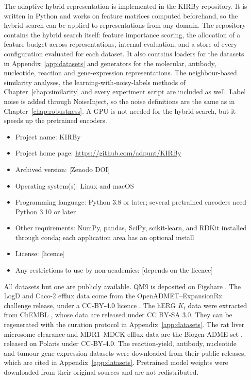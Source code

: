 The adaptive hybrid representation is implemented in the KIRBy repository. It is written in Python and works on feature matrices computed beforehand, so the hybrid search can be applied to representations from any domain. The repository contains the hybrid search itself: feature importance scoring, the allocation of a feature budget across representations, internal evaluation, and a store of every configuration evaluated for each dataset. It also contains loaders for the datasets in Appendix~\ref{app:datasets} and generators for the molecular, antibody, nucleotide, reaction and gene-expression representations. The neighbour-based similarity analyses, the learning-with-noisy-labels methods of Chapter~\ref{chap:similarity} and every experiment script are included as well. Label noise is added through NoiseInject, so the noise definitions are the same as in Chapter~\ref{chap:robustness}. A GPU is not needed for the hybrid search, but it speeds up the pretrained encoders.

\begin{itemize}
    \item Project name: KIRBy
    \item Project home page: \url{https://github.com/adpunt/KIRBy}
    \item Archived version: [Zenodo DOI]
    \item Operating system(s): Linux and macOS
    \item Programming language: Python 3.8 or later; several pretrained encoders need Python 3.10 or later
    \item Other requirements: NumPy, pandas, SciPy, scikit-learn, and RDKit installed through conda; each application area has an optional install
    \item License: [licence]
    \item Any restrictions to use by non-academics: [depends on the licence]
\end{itemize}


All datasets but one are publicly available. QM9 \citep{Ramakrishnan2014} is deposited on Figshare \citep{qm9_dataset}. The LogD and Caco-2 efflux data come from the OpenADMET--ExpansionRx challenge release, under a CC-BY-4.0 licence \citep{openadmet}. The hERG $K_i$ data were extracted from ChEMBL \citep{Zdrazil2023}, whose data are released under CC BY-SA 3.0. They can be regenerated with the curation protocol in Appendix~\ref{app:datasets}. The rat liver microsome clearance and MDR1--MDCK efflux data are the Biogen ADME set \citep{fang2023}, released on Polaris \citep{polaris} under CC-BY-4.0. The reaction-yield, antibody, nucleotide and tumour gene-expression datasets were downloaded from their public releases, which are cited in Appendix~\ref{app:datasets}. Pretrained model weights were downloaded from their original sources and are not redistributed.

